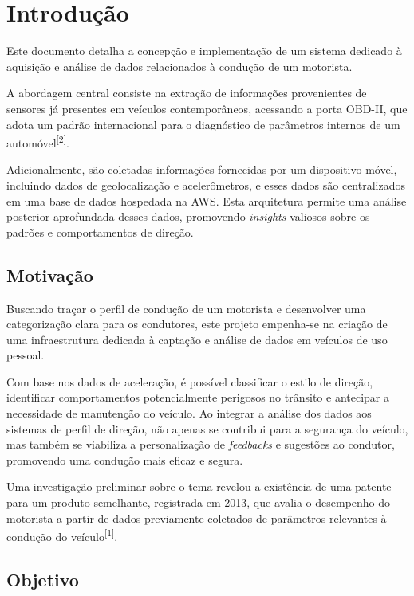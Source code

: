 \chapter{Introdução}\label{CAP:introducao}

Este documento detalha a concepção e implementação de um sistema dedicado à aquisição e análise de dados relacionados à condução de um motorista.

A abordagem central consiste na extração de informações provenientes de sensores já presentes em veículos contemporâneos, acessando a porta OBD-II, que adota um padrão internacional para o diagnóstico de parâmetros internos de um automóvel\textsuperscript{[2]}.

Adicionalmente, são coletadas informações fornecidas por um dispositivo móvel, incluindo dados de geolocalização e acelerômetros, e esses dados são centralizados em uma base de dados hospedada na AWS. Esta arquitetura permite uma análise posterior aprofundada desses dados, promovendo \textit{insights} valiosos sobre os padrões e comportamentos de direção.

\section{Motivação}

Buscando traçar o perfil de condução de um motorista e desenvolver uma categorização clara para os condutores, este projeto empenha-se na criação de uma infraestrutura dedicada à captação e análise de dados em veículos de uso pessoal.

Com base nos dados de aceleração, é possível classificar o estilo de direção, identificar comportamentos potencialmente perigosos no trânsito e antecipar a necessidade de manutenção do veículo. Ao integrar a análise dos dados aos sistemas de perfil de direção, não apenas se contribui para a segurança do veículo, mas também se viabiliza a personalização de \textit{feedbacks} e sugestões ao condutor, promovendo uma condução mais eficaz e segura.

Uma investigação preliminar sobre o tema revelou a existência de uma patente para um produto semelhante, registrada em 2013, que avalia o desempenho do motorista a partir de dados previamente coletados de parâmetros relevantes à condução do veículo\textsuperscript{[1]}.


\section{Objetivo}


